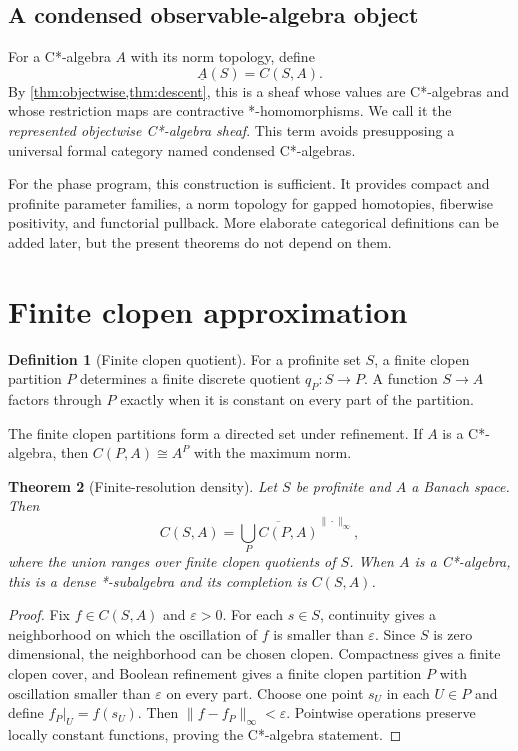 \documentclass[12pt]{article}
\newtheorem{theorem}{Theorem}[section]
\theoremstyle{definition}
\newtheorem{definition}[theorem]{Definition}
\theoremstyle{remark}
\begin{document}
\subsection{A condensed observable-algebra object}

For a C*-algebra $A$ with its norm topology, define
\[
\underline A(S)=C(S,A).
\]
By \cref{thm:objectwise,thm:descent}, this is a sheaf whose values are C*-algebras
and whose restriction maps are contractive *-homomorphisms.  We call it the
\emph{represented objectwise C*-algebra sheaf}.  This term avoids presupposing a
universal formal category named condensed C*-algebras.

For the phase program, this construction is sufficient.  It provides compact and
profinite parameter families, a norm topology for gapped homotopies, fiberwise
positivity, and functorial pullback.  More elaborate categorical definitions can be
added later, but the present theorems do not depend on them.

\section{Finite clopen approximation}

\begin{definition}[Finite clopen quotient]
For a profinite set $S$, a finite clopen partition $P$ determines a finite discrete
quotient $q_P:S\to P$.  A function $S\to A$ factors through $P$ exactly when it is
constant on every part of the partition.
\end{definition}

The finite clopen partitions form a directed set under refinement.  If $A$ is a
C*-algebra, then $C(P,A)\cong A^P$ with the maximum norm.

\begin{theorem}[Finite-resolution density]\label{thm:clopen}
Let $S$ be profinite and $A$ a Banach space.  Then
\[
C(S,A)
=
\overline{
\bigcup_{P} C(P,A)
}^{\|\cdot\|_\infty},
\]
where the union ranges over finite clopen quotients of $S$.  When $A$ is a
C*-algebra, this is a dense *-subalgebra and its completion is $C(S,A)$.
\end{theorem}

\begin{proof}
Fix $f\in C(S,A)$ and $\varepsilon>0$.  For each $s\in S$, continuity gives a
neighborhood on which the oscillation of $f$ is smaller than $\varepsilon$.  Since
$S$ is zero dimensional, the neighborhood can be chosen clopen.  Compactness gives
a finite clopen cover, and Boolean refinement gives a finite clopen partition $P$
with oscillation smaller than $\varepsilon$ on every part.  Choose one point $s_U$
in each $U\in P$ and define $f_P|_U=f(s_U)$.  Then
$\|f-f_P\|_\infty<\varepsilon$.  Pointwise operations preserve locally constant
functions, proving the C*-algebra statement.
\end{proof}
\end{document}
